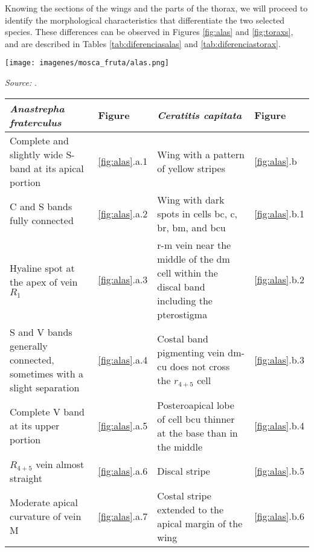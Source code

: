 
Knowing the sections of the wings and the parts of the thorax, we will proceed to identify the morphological characteristics that differentiate the two selected species. These differences can be observed in Figures \ref{fig:alas} and \ref{fig:toraxs}, and are described in Tables \ref{tab:diferenciasalas} and \ref{tab:diferenciastorax}.

\begin{figure*}[htbp]
    \centering
    \texttt{[image: imagenes/mosca\_fruta/alas.png]}
    \caption{a. Wing of \textit{Anastrepha fraterculus}. b. Wing of \textit{Ceratitis capitata}.}
    \scriptsize \textit{Source:} \cite{especiesImEco}.
    \label{fig:alas}
\end{figure*}

\begin{table*}[htbp]
	\centering
	\caption{Differences in wings. \cite{senasaTephritidae, senasaAnastrepha, especiesImEco}}
	\label{tab:diferenciasalas}
	\begin{tabular}{|p{}|p{}|p{}|p{}|}
		\hline
		\textbf{\textit{Anastrepha fraterculus}} & \textbf{Figure} & \textbf{\textit{Ceratitis capitata}} & \textbf{Figure} \\
		\hline
		Complete and slightly wide S-band at its apical portion & \ref{fig:alas}.a.1 & Wing with a pattern of yellow stripes & \ref{fig:alas}.b \\
		\hline
		C and S bands fully connected & \ref{fig:alas}.a.2 & Wing with dark spots in cells bc, c, br, bm, and bcu & \ref{fig:alas}.b.1 \\
		\hline
		Hyaline spot at the apex of vein $R_1$ & \ref{fig:alas}.a.3 & r-m vein near the middle of the dm cell within the discal band including the pterostigma & \ref{fig:alas}.b.2 \\
		\hline
		S and V bands generally connected, sometimes with a slight separation & \ref{fig:alas}.a.4 & Costal band pigmenting vein dm-cu does not cross the $r_{4+5}$ cell & \ref{fig:alas}.b.3 \\
		\hline
		Complete V band at its upper portion & \ref{fig:alas}.a.5 & Posteroapical lobe of cell bcu thinner at the base than in the middle & \ref{fig:alas}.b.4 \\
		\hline
		$R_{4+5}$ vein almost straight & \ref{fig:alas}.a.6 & Discal stripe & \ref{fig:alas}.b.5 \\
		\hline
		Moderate apical curvature of vein M & \ref{fig:alas}.a.7 & Costal stripe extended to the apical margin of the wing & \ref{fig:alas}.b.6 \\
		\hline
	\end{tabular}
\end{table*}

